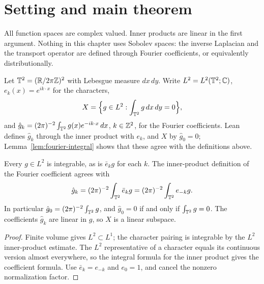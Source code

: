 \chapter{Setting and main theorem}
\label{chap:setup}

All function spaces are complex valued. Inner products are linear in the
first argument. Nothing in this chapter uses Sobolev spaces: the inverse
Laplacian and the transport operator are defined through Fourier coefficients,
or equivalently distributionally.

\begin{definition}
\label{def:torus}
\leanok
Let $\mathbb{T}^2=(\mathbb{R}/2\pi\mathbb{Z})^2$ with Lebesgue measure $dx\,dy$. Write $L^2=L^2(\mathbb{T}^2;\mathbb{C})$,
$e_k(x)=e^{ik\cdot x}$ for the characters,
\[
  X=\Big\{g\in L^2:\int_{\mathbb{T}^2}g\,dx\,dy=0\Big\},
\]
and $\hat g_k=(2\pi)^{-2}\int_{\mathbb{T}^2}g(x)e^{-ik\cdot x}\,dx$, $k\in\mathbb{Z}^2$, for the
Fourier coefficients. Lean defines $\hat g_k$ through the inner product with
$e_k$, and $X$ by $\hat g_0=0$; Lemma~\ref{lem:fourier-integral} shows that
these agree with the definitions above.
\end{definition}

\begin{lemma}
\label{lem:fourier-integral}
\leanok
Every $g\in L^2$ is integrable, as is $\bar e_k g$ for each $k$. The
inner-product definition of the Fourier coefficient agrees with
\[
 \hat g_k=(2\pi)^{-2}\int_{\mathbb{T}^2}\bar e_k g
         =(2\pi)^{-2}\int_{\mathbb{T}^2}e_{-k}g.
\]
In particular $\hat g_0=(2\pi)^{-2}\int_{\mathbb{T}^2}g$, and
$\hat g_0=0$ if and only if $\int_{\mathbb{T}^2}g=0$. The coefficients $\hat g_k$ are
linear in $g$, so $X$ is a linear subspace.
\end{lemma}

\begin{proof}
\leanok
Finite volume gives $L^2\subset L^1$; the character pairing is integrable by
the $L^2$ inner-product estimate. The $L^2$ representative of a character
equals its continuous version almost everywhere, so the integral formula
for the inner product gives the coefficient formula. Use
$\bar e_k=e_{-k}$ and $e_0=1$, and cancel the nonzero normalization factor.
\end{proof}

